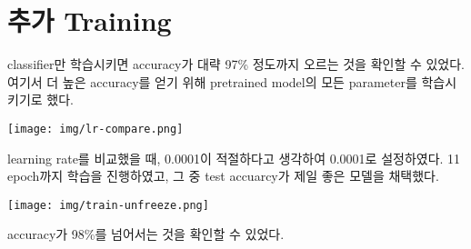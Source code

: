 \section{추가 Training}
classifier만 학습시키면 accuracy가 대략 97\% 정도까지 오르는 것을 확인할 수 있었다.
여기서 더 높은 accuracy를 얻기 위해 pretrained model의 모든 parameter를 학습시키기로 했다.

\begin{center}
    \texttt{[image: img/lr-compare.png]}
\end{center}

learning rate를 비교했을 때, 0.0001이 적절하다고 생각하여 0.0001로 설정하였다.
11 epoch까지 학습을 진행하였고, 그 중 test accuarcy가 제일 좋은 모델을 채택했다.

\begin{center}
    \texttt{[image: img/train-unfreeze.png]}
\end{center}

accuracy가 98\%를 넘어서는 것을 확인할 수 있었다.



